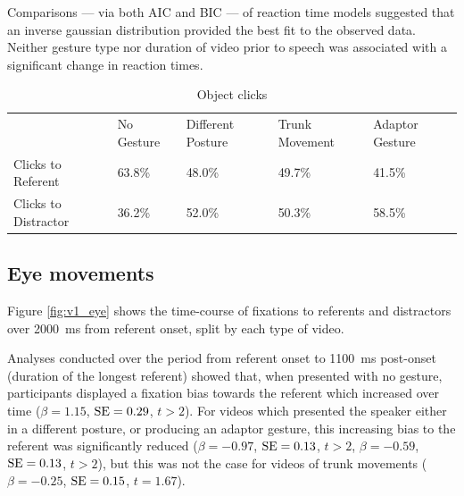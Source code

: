 \documentclass[a4paper,man,natbib]{apa6}
\newcommand{\resultsLM}[3]{$\beta = #1$, $\textnormal{SE} = #2$, $t #3$}
\begin{document}
Comparisons --- via both AIC and BIC --- of reaction time models suggested that an inverse gaussian distribution provided the best fit to the observed data.
Neither gesture type nor duration of video prior to speech was associated with a significant change in reaction times.

\begin{table}
\caption{Object clicks}
\label{table:v1_clicks}
\begin{tabularx}{\linewidth}{YYYYY}
\hline
& No Gesture & Different Posture & Trunk Movement & Adaptor Gesture \\
Clicks to Referent & 63.8\% & 48.0\% & 49.7\% & 41.5\%  \\ 
Clicks to Distractor & 36.2\% & 52.0\% & 50.3\% & 58.5\% \\
\hline
\end{tabularx}
\end{table}

\subsection{Eye movements}
Figure \ref{fig:v1_eye} shows the time-course of fixations to referents and distractors over 2000~ms from referent onset, split by each type of video.

Analyses conducted over the period from referent onset to 1100~ms post-onset (duration of the longest referent) showed that, when presented with no gesture, participants displayed a fixation bias towards the referent which increased over time (\resultsLM{1.15}{0.29}{>2}).
For videos which presented the speaker either in a different posture, or producing an adaptor gesture, this increasing bias to the referent was significantly reduced
(\resultsLM{-0.97}{0.13}{>2}, \resultsLM{-0.59}{0.13}{>2}), but this was not the case for videos of trunk movements (\resultsLM{-0.25}{0.15}{=1.67}). 
\end{document}
